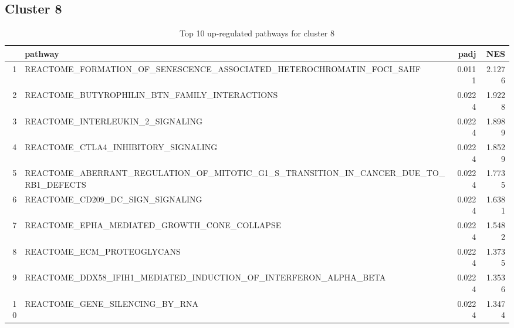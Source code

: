 \documentclass{article}
\begin{document}
\subsection{Cluster 8 }
\begin{table}[H]
\centering
\begin{tabularx}{\textwidth}{rlrr}
  \hline
 & pathway & padj & NES \\ 
  \hline
1 & REACTOME\_FORMATION\_OF\_SENESCENCE\_ASSOCIATED\_HETEROCHROMATIN\_FOCI\_SAHF & 0.0111 & 2.1276 \\ 
  2 & REACTOME\_BUTYROPHILIN\_BTN\_FAMILY\_INTERACTIONS & 0.0224 & 1.9228 \\ 
  3 & REACTOME\_INTERLEUKIN\_2\_SIGNALING & 0.0224 & 1.8989 \\ 
  4 & REACTOME\_CTLA4\_INHIBITORY\_SIGNALING & 0.0224 & 1.8529 \\ 
  5 & REACTOME\_ABERRANT\_REGULATION\_OF\_MITOTIC\_G1\_S\_TRANSITION\_IN\_CANCER\_DUE\_TO\_RB1\_DEFECTS & 0.0224 & 1.7735 \\ 
  6 & REACTOME\_CD209\_DC\_SIGN\_SIGNALING & 0.0224 & 1.6381 \\ 
  7 & REACTOME\_EPHA\_MEDIATED\_GROWTH\_CONE\_COLLAPSE & 0.0224 & 1.5482 \\ 
  8 & REACTOME\_ECM\_PROTEOGLYCANS & 0.0224 & 1.3735 \\ 
  9 & REACTOME\_DDX58\_IFIH1\_MEDIATED\_INDUCTION\_OF\_INTERFERON\_ALPHA\_BETA & 0.0224 & 1.3536 \\ 
  10 & REACTOME\_GENE\_SILENCING\_BY\_RNA & 0.0224 & 1.3474 \\ 
   \hline
\end{tabularx}
\caption{Top 10 up-regulated pathways for cluster 8} 
\label{tab:q3_2_8}
\end{table}
\end{document}
